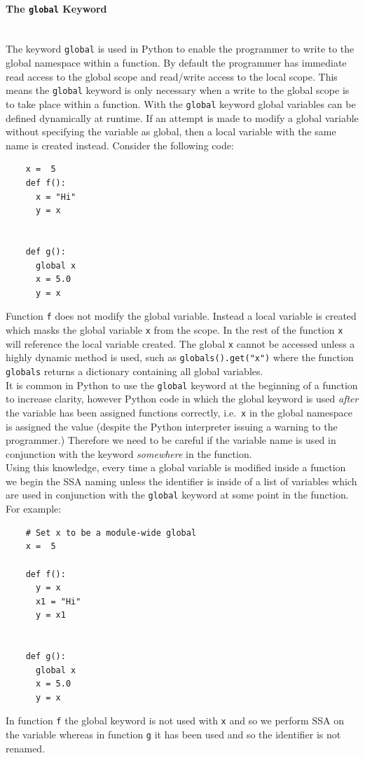 \documentclass[12pt, titlepage]{article}
\begin{document}
\paragraph*{The \texttt{global} Keyword}\mbox{} \\
The keyword \texttt{global} is used in Python to enable the programmer to write to the global namespace within a function. By default the programmer has immediate read access to the global scope and read/write access to the local scope. This means the \texttt{global} keyword is only necessary when a write to the global scope is to take place within a function. With the \texttt{global} keyword global variables can be defined dynamically at runtime. If an attempt is made to modify a global variable without specifying the variable as global, then a local variable with the same name is created instead. Consider the following code:
\begin{lstlisting}
    x =  5
    def f():
      x = "Hi"
      y = x
      
      
    def g():
      global x
      x = 5.0
      y = x
\end{lstlisting}
Function \texttt{f} does not modify the global variable. Instead a local variable is created which masks the global variable \texttt{x} from the scope. In the rest of the function \texttt{x} will reference the local variable created. The global \texttt{x} cannot be accessed unless a highly dynamic method is used, such as \texttt{globals().get("x")} where the function \texttt{globals} returns a dictionary containing all global variables. \\
\indent It is common in Python to use the \texttt{global} keyword at the beginning of a function to increase clarity, however Python code in which the global keyword is used \textit{after} the variable has been assigned functions correctly, i.e.\ \texttt{x} in the global namespace is assigned the value (despite the Python interpreter issuing a warning to the programmer.) Therefore we need to be careful if the variable name is used in conjunction with the keyword \textit{somewhere} in the function. \\
\indent Using this knowledge, every time a global variable is modified inside a function we begin the SSA naming unless the identifier is inside of a list of variables which are used in conjunction with the \texttt{global} keyword at some point in the function. For example:
\begin{lstlisting}
    # Set x to be a module-wide global
    x =  5
    
    def f():
      y = x
      x1 = "Hi"
      y = x1
      
     
    def g():
      global x
      x = 5.0
      y = x
\end{lstlisting}
In function \texttt{f} the global keyword is not used with \texttt{x} and so we perform SSA on the variable whereas in function \texttt{g} it has been used and so the identifier is not renamed.
\end{document}
